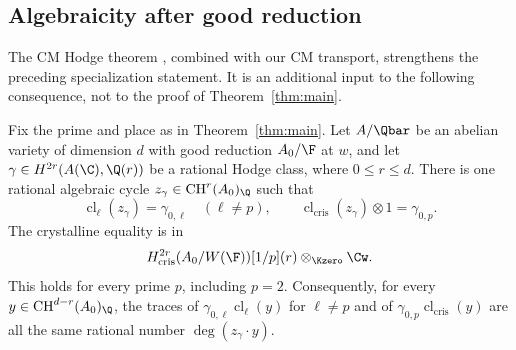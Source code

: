 \subsection{Algebraicity after good reduction}

The CM Hodge theorem \cite[Theorem~1.1]{OpenAICMHodge2026}, combined
with our CM transport, strengthens the preceding specialization
statement. It is an additional input to the following consequence,
not to the proof of Theorem~\ref{thm:main}.

\begin{corollary}
\label{cor:algebraic-specialization}
Fix the prime and place as in Theorem~\ref{thm:main}. Let
\(A/\Qbar\) be an abelian variety of dimension \(d\) with good
reduction \(A_0/\F\) at \(w\), and let
\(\gamma\in H^{2r}(A(\C),\Q(r))\) be a rational Hodge class,
where \(0\leq r\leq d\). There is one rational algebraic cycle
\(z_\gamma\in\operatorname{CH}^r(A_0)_{\Q}\) such that
\[
 \operatorname{cl}_\ell(z_\gamma)=\gamma_{0,\ell}
       \quad(\ell\ne p),\qquad
 \operatorname{cl}_{\mathrm{cris}}(z_\gamma)\otimes1=\gamma_{0,p}.
\]
The crystalline equality is in
\[
 H^{2r}_{\mathrm{cris}}(A_0/W(\F))[1/p](r)
       \otimes_{\Kzero}\Cw.
\]
This holds for every prime \(p\), including \(p=2\).
Consequently, for every
\(y\in\operatorname{CH}^{d-r}(A_0)_{\Q}\), the traces of
\(\gamma_{0,\ell}\operatorname{cl}_\ell(y)\) for \(\ell\ne p\)
and of \(\gamma_{0,p}\operatorname{cl}_{\mathrm{cris}}(y)\)
are all the same rational number \(\deg(z_\gamma\cdot y)\).
\end{corollary}

